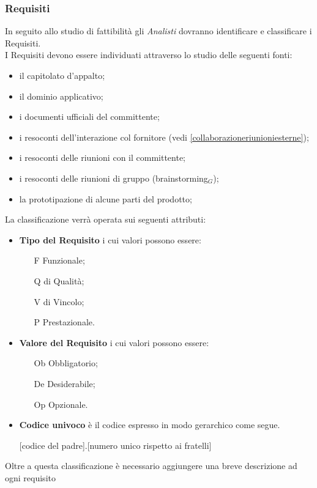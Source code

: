 \subsubsection{Requisiti}
In seguito allo studio di fattibilità gli \textit{Analisti} dovranno identificare e classificare i Requisiti. \\
I Requisiti devono essere individuati attraverso lo studio delle seguenti fonti:
\begin{itemize}
\item il capitolato d'appalto;
\item il dominio applicativo;
\item i documenti ufficiali del committente;
\item i resoconti dell'interazione col fornitore (vedi \ref{collaborazioneriunioniesterne});
\item i resoconti delle riunioni con il committente;
\item i resoconti delle riunioni di gruppo (brainstorming$_G$);
\item la prototipazione di alcune parti del prodotto;
\end{itemize}
La classificazione verrà operata sui seguenti attributi:
\begin{itemize}
\item \textbf{Tipo del Requisito} i cui valori possono essere:
\begin{itemize}
\item[F] Funzionale;
\item[Q] di Qualità;
\item[V] di Vincolo;
\item[P] Prestazionale.
\end{itemize}
\item \textbf{Valore del Requisito} i cui valori possono essere:
\begin{itemize}
\item[Ob] Obbligatorio;
\item[De] Desiderabile;
\item[Op] Opzionale.
\end{itemize}
\item \textbf{Codice univoco} è il codice espresso in modo gerarchico come segue.
\begin{center}
[codice del padre].[numero unico rispetto ai fratelli]
\end{center}
\end{itemize} 
Oltre a questa classificazione è necessario aggiungere una breve descrizione ad ogni requisito
